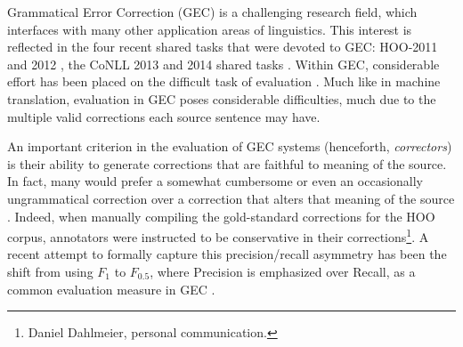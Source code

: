 \documentclass[english]{article}
\begin{document}



Grammatical Error Correction (GEC) is a challenging research field, which interfaces with many other application areas of linguistics. This interest is reflected in the four recent shared tasks that were devoted to GEC: HOO-2011 and 2012 \cite{dale2011helping,dale2012hoo}, the CoNLL 2013 and 2014
shared tasks \cite{kao2013conll,ng2014conll}.
Within GEC, considerable effort has been placed on the difficult task of
evaluation \cite{tetreault2008native,madnani2011they,chodorow2012problems,dahlmeier2012better}.
Much like in machine translation, evaluation in GEC poses considerable difficulties, much
due to the multiple valid corrections each source sentence may have.

An important criterion in the evaluation of GEC systems (henceforth, {\it correctors}) is their ability to
generate corrections that are faithful to meaning of the source. In fact, many would prefer
a somewhat cumbersome or even an occasionally ungrammatical correction over a correction
that alters that meaning of the source \citet{brockett2006correcting}.
Indeed, when manually compiling the gold-standard corrections for the HOO corpus, annotators were instructed to be conservative in their corrections\footnote{Daniel Dahlmeier, personal communication.}.
A recent attempt to formally capture this precision/recall asymmetry has been the shift from using $F_1$ to $F_{0.5}$, where Precision is emphasized over Recall, as a common evaluation measure in GEC \cite{dahlmeier2012better}.
\end{document}
